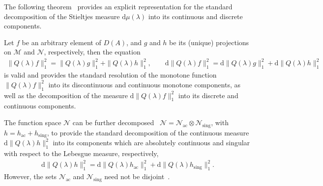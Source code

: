 \documentclass[leqno,onefignum,onetabnum]{siamltex1213}
\renewcommand{\d}{\mathrm{d}}
\newcommand{\Mc}{\mathcal{M}}
\newcommand{\Nc}{\mathcal{N}}
\begin{document}
The following theorem~\cite{Stone:64} provides an explicit
representation for the standard decomposition of the Stieltjes measure
$\d\mu(\lambda)$ into its continuous and discrete components.
%
\begin{theorem}
Let $f$ be an arbitrary element of $D(A)$, and $g$ and $h$ be its (unique)
projections on $\Mc$ and $\Nc$, respectively, then the equation
%
\begin{align}
  \|Q(\lambda)f\|_1^2=\|Q(\lambda)g\|_1^2+\|Q(\lambda)h\|_1^2, \qquad
  \d\|Q(\lambda)f\|_1^2=\d\|Q(\lambda)g\|_1^2+\d\|Q(\lambda)h\|_1^2
\end{align}
%
is valid and provides the standard resolution of the monotone function
$\|Q(\lambda)f\|_1^2$ into its discontinuous and continuous monotone
components, as well as the decomposition of the measure
$\d\|Q(\lambda)f\|_1^2$ into its discrete and continuous components.  
\end{theorem}
%
\noindent
The function space $\Nc$ can be further decomposed~\cite{Reed-1980}
$\Nc=\Nc_{\text{ac}}\otimes\Nc_{\text{sing}}$, with
$h=h_{\text{ac}}+h_{\text{sing}}$, to provide the standard
\cite{Folland:99:RealAnalysis} decomposition of the continuous measure
$\d\|Q(\lambda)h\|_1^2$ into its components which are absolutely continuous
and singular with respect to the Lebesgue measure, respectively,
%
\begin{align}
  \d\|Q(\lambda)h\|_1^2=\d\|Q(\lambda)h_{\text{ac}}\|_1^2+\d\|Q(\lambda)h_{\text{sing}}\|_1^2.
\end{align}
%
However, the sets $\Nc_{\text{ac}}$ and $\Nc_{\text{sing}}$ need not
be disjoint~\cite{Reed-1980}. 
\end{document}
